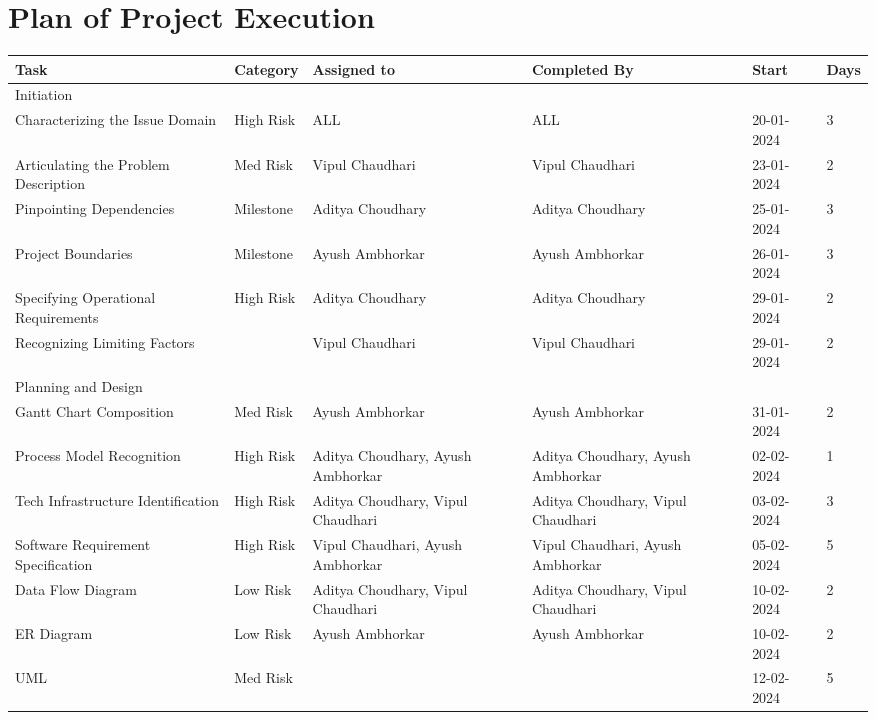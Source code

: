 \section{Plan of Project Execution}

\begin{table}[htbp]
\centering
\footnotesize
\begin{tabular}{|p{2.5cm}|p{2cm}|p{2cm}|p{2cm}|p{2.5cm}|p{2.5cm}|}
\hline
\textbf{Task} & \textbf{Category} & \textbf{Assigned to} & \textbf{Completed By} & \textbf{Start} & \textbf{Days} \\
\hline
Initiation & & & & & \\
\hline
Characterizing the Issue Domain & High Risk & ALL & ALL & 20-01-2024 & 3 \\
Articulating the Problem Description & Med Risk & Vipul Chaudhari & Vipul Chaudhari & 23-01-2024 & 2 \\
Pinpointing Dependencies & Milestone & Aditya Choudhary & Aditya Choudhary & 25-01-2024 & 3 \\
Project Boundaries & Milestone & Ayush Ambhorkar & Ayush Ambhorkar & 26-01-2024 & 3 \\
Specifying Operational Requirements & High Risk & Aditya Choudhary & Aditya Choudhary & 29-01-2024 & 2 \\
Recognizing Limiting Factors & & Vipul Chaudhari & Vipul Chaudhari & 29-01-2024 & 2 \\
\hline
Planning and Design & & & & & \\
\hline
Gantt Chart Composition & Med Risk & Ayush Ambhorkar & Ayush Ambhorkar & 31-01-2024 & 2 \\
Process Model Recognition & High Risk & Aditya Choudhary, Ayush Ambhorkar & Aditya Choudhary, Ayush Ambhorkar & 02-02-2024 & 1 \\
Tech Infrastructure Identification & High Risk & Aditya Choudhary, Vipul Chaudhari & Aditya Choudhary, Vipul Chaudhari & 03-02-2024 & 3 \\
Software Requirement Specification & High Risk & Vipul Chaudhari, Ayush Ambhorkar & Vipul Chaudhari, Ayush Ambhorkar & 05-02-2024 & 5 \\
Data Flow Diagram & Low Risk & Aditya Choudhary, Vipul Chaudhari & Aditya Choudhary, Vipul Chaudhari & 10-02-2024 & 2 \\
ER Diagram & Low Risk & Ayush Ambhorkar & Ayush Ambhorkar & 10-02-2024 & 2 \\
UML & Med Risk & & & 12-02-2024 & 5 \\
\hline
\end{tabular}
\end{table}
